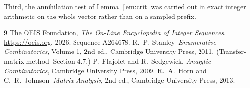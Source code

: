 \documentclass[11pt,a4paper]{article}
\theoremstyle{plain}
\theoremstyle{definition}
\begin{document}
Third, the annihilation test of Lemma~\ref{lem:crit} was carried out in exact integer
arithmetic on the whole vector rather than on a sampled prefix.

\begin{thebibliography}{9}
 The OEIS Foundation, \emph{The On-Line Encyclopedia of Integer
Sequences}, \url{https://oeis.org}, 2026. Sequence A264678.
 R.~P.~Stanley, \emph{Enumerative Combinatorics}, Volume 1, 2nd ed.,
Cambridge University Press, 2011. (Transfer-matrix method, Section 4.7.)
 P.~Flajolet and R.~Sedgewick, \emph{Analytic Combinatorics}, Cambridge
University Press, 2009.
 R.~A.~Horn and C.~R.~Johnson, \emph{Matrix Analysis}, 2nd ed., Cambridge
University Press, 2013.
\end{thebibliography}
\end{document}
